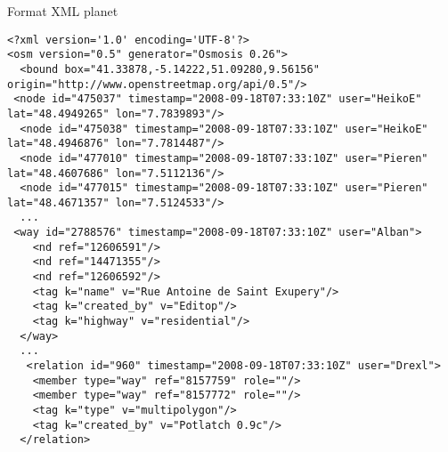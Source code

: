 






\begin{frame}[fragile]{Format XML planet}

\footnotesize
\begin{verbatim}
<?xml version='1.0' encoding='UTF-8'?>
<osm version="0.5" generator="Osmosis 0.26">
  <bound box="41.33878,-5.14222,51.09280,9.56156" origin="http://www.openstreetmap.org/api/0.5"/>
 <node id="475037" timestamp="2008-09-18T07:33:10Z" user="HeikoE" lat="48.4949265" lon="7.7839893"/>
  <node id="475038" timestamp="2008-09-18T07:33:10Z" user="HeikoE" lat="48.4946876" lon="7.7814487"/>
  <node id="477010" timestamp="2008-09-18T07:33:10Z" user="Pieren" lat="48.4607686" lon="7.5112136"/>
  <node id="477015" timestamp="2008-09-18T07:33:10Z" user="Pieren" lat="48.4671357" lon="7.5124533"/>
  ...
 <way id="2788576" timestamp="2008-09-18T07:33:10Z" user="Alban">
    <nd ref="12606591"/>
    <nd ref="14471355"/>
    <nd ref="12606592"/>
    <tag k="name" v="Rue Antoine de Saint Exupery"/>
    <tag k="created_by" v="Editop"/>
    <tag k="highway" v="residential"/>
  </way>
  ...
   <relation id="960" timestamp="2008-09-18T07:33:10Z" user="Drexl">
    <member type="way" ref="8157759" role=""/>
    <member type="way" ref="8157772" role=""/>
    <tag k="type" v="multipolygon"/>
    <tag k="created_by" v="Potlatch 0.9c"/>
  </relation>
\end{verbatim}

\end{frame}



